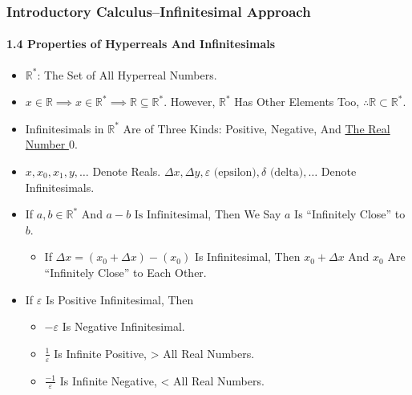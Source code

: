 \begin{frame}
\frametitle{Introductory Calculus--Infinitesimal Approach}
\framesubtitle{1.4 Properties of Hyperreals And Infinitesimals}
\label{slide:1.4-06}
\begin{itemize}
\item $\mathbb{R}^*$: The Set of All Hyperreal Numbers.
\pause\item $x\in\mathbb{R}\implies x\in\mathbb{R}^*\implies\mathbb{R}\subseteq\mathbb{R}^*$. However, $\mathbb{R}^*$ Has Other Elements Too, \alert{$\therefore \mathbb{R}\subset\mathbb{R}^*$}.
\pause\item Infinitesimals in $\mathbb{R}^*$ Are of \alert{Three Kinds: Positive, Negative, And \underline{The Real Number $0$}}.
\pause\item $x,x_0,x_1,y,\dots$ Denote Reals. $\Delta x, \Delta y, \varepsilon\text{ (epsilon)},\delta\text{ (delta)},\dots$ Denote Infinitesimals.
\pause\item If $a,b\in\mathbb{R}^*$ And $a-b \text{ Is Infinitesimal}$, Then We Say \alert{$a$ Is ``Infinitely Close'' to $b$}.
\begin{itemize}
\pause\item If $\Delta x=(x_0+\Delta x)-(x_0)$ Is Infinitesimal, Then \alert{$x_0+\Delta x$ And $x_0$ Are ``Infinitely Close'' to Each Other}.
\end{itemize}
\pause \item If \alert{$\varepsilon$ Is Positive Infinitesimal}, Then 
\begin{itemize}
\pause\item\alert{$-\varepsilon$ Is Negative Infinitesimal}.
\pause\item\alert{$\frac{1}{\varepsilon}$ Is Infinite Positive, > All Real Numbers}.
\pause\item\alert{$\frac{-1}{\varepsilon}$ Is Infinite Negative, < All Real Numbers}.
\end{itemize}
\end{itemize}
\end{frame}
